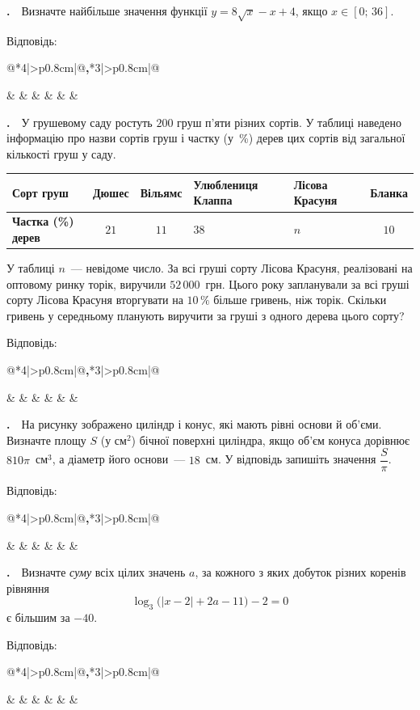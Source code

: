 \documentclass[12pt]{article}
\makeatletter
\newcommand{\nmtAnswerBox}{%
\par\vspace{0.2cm}\noindent
Відповідь:\ \ 
\begin{tabular}{@{}*{4}{|>{\centering\arraybackslash}p{0.8cm}}|@{\hspace{0.1cm}\textbf{,}\hspace{0.1cm}}*{3}{|>{\centering\arraybackslash}p{0.8cm}}|@{}}
\hline
\rule[-0.2cm]{0pt}{0.7cm} & & & & & & \\
\hline
\end{tabular}
\par\vspace{0.3cm}}
\newcounter{zad}
\newcommand{\zadtask}[1]{\stepcounter{zad}\par\vspace{0.3cm}\noindent\textbf{\thezad.}\ \ #1\par\vspace{0.2cm}}
\newcommand{\zadnum}{\stepcounter{zad}\noindent\textbf{\thezad.}\ \ }
\makeatother
\begin{document}
\zadtask{Визначте найбільше значення функції $y = 8\sqrt{x} - x + 4$, якщо $x \in [0;\, 36]$.}
\nmtAnswerBox

\zadtask{У грушевому саду ростуть $200$ груш п'яти різних сортів. У таблиці наведено інформацію про назви сортів груш і частку (у~\%) дерев цих сортів від загальної кількості груш у саду.
\vspace{0.2cm}

\noindent\begin{center}
\renewcommand{\arraystretch}{1.3}
\begin{tabular}{|>{\centering\arraybackslash}m{2.2cm}|c|c|>{\centering\arraybackslash}m{2cm}|>{\centering\arraybackslash}m{2cm}|c|}
\hline
\textbf{Сорт груш} & Дюшес & Вільямс & Улюблениця Клаппа & Лісова Красуня & Бланка \\
\hline
\textbf{Частка (\%) дерев} & $21$ & $11$ & $38$ & $n$ & $10$ \\
\hline
\end{tabular}
\end{center}
\vspace{0.2cm}

У таблиці $n$~--- невідоме число. За всі груші сорту Лісова Красуня, реалізовані на оптовому ринку торік, виручили $52\,000$~грн. Цього року запланували за всі груші сорту Лісова Красуня вторгувати на $10\,\%$ більше гривень, ніж торік. Скільки гривень у середньому планують виручити за груші з одного дерева цього сорту?}
\nmtAnswerBox

\noindent
\begin{minipage}[c]{0.56\textwidth}
\zadnum На рисунку зображено циліндр і конус, які мають рівні основи й об'єми. Визначте площу $S$ (у см$^2$) бічної поверхні циліндра, якщо об'єм конуса дорівнює $810\pi$~см$^3$, а діаметр його основи~--- $18$~см. У відповідь запишіть значення $\dfrac{S}{\pi}$.
\end{minipage}%
\hfill
\begin{minipage}[c]{0.42\textwidth}
\centering
{}
\end{minipage}
\par\vspace{0.2cm}
\nmtAnswerBox

\zadtask{Визначте \textit{суму} всіх цілих значень $a$, за кожного з яких добуток різних коренів рівняння
\[
\log_3\!\big(|x - 2| + 2a - 11\big) - 2 = 0
\]
є більшим за $-40$.}
\nmtAnswerBox
\end{document}
